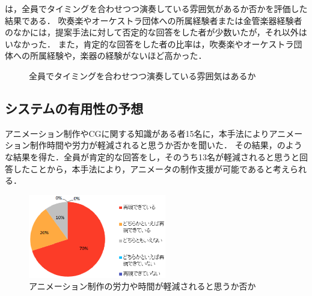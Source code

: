 は，全員でタイミングを合わせつつ演奏している雰囲気があるか否かを評価した結果である．
吹奏楽やオーケストラ団体への所属経験者または金管楽器経験者のなかには，提案手法に対して否定的な回答をした者が少数いたが，それ以外はいなかった．
また，肯定的な回答をした者の比率は，吹奏楽やオーケストラ団体への所属経験や，楽器の経験がないほど高かった．
\begin{figure}[!h]
	\centering
	\caption{全員でタイミングを合わせつつ演奏している雰囲気はあるか}
	\label{fig:Q3-2}
\end{figure}
%
\newpage
\subsection{システムの有用性の予想}
アニメーション制作やCGに関する知識がある者15名に，本手法によりアニメーション制作時間や労力が軽減されると思うか否かを聞いた．
その結果，のような結果を得た．全員が肯定的な回答をし，そのうち13名が軽減されると思うと回答したことから，本手法により，アニメータの制作支援が可能であると考えられる．
\begin{figure}[!h]
	\centering
	\includegraphics[width=6cm]{fig/chap4/Q1-1-1.eps}
	\caption{アニメーション制作の労力や時間が軽減されると思うか否か}
	\label{fig:ans2}
\end{figure}


